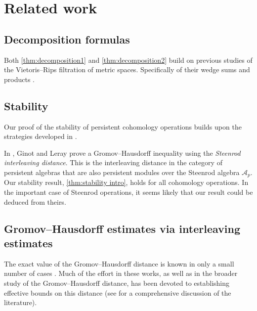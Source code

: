 
\section*{Related work}

\subsection*{Decomposition formulas}

Both \cref{thm:decomposition1} and \cref{thm:decomposition2} build on previous studies of the Vietoris--Rips filtration of metric spaces.
Specifically of their wedge sums \cite{adamaszek2020homotopy} and products \cite{adamaszek2017VietorisProduct, gakhar2019k, lim2024vietoris}.

\subsection*{Stability}

Our proof of the stability of persistent cohomology operations builds upon the strategies developed in \cite{blumberg2023interleaving, zhou2023beyond, memoli2024persistent}.

In \cite[Theorem~87]{ginot2019distances}, Ginot and Leray prove a Gromov--Hausdorff inequality using the \textit{Steenrod interleaving distance}.
This is the interleaving distance in the category of persistent algebras that are also persistent modules over the Steenrod algebra \(\mathcal{A}_p\).
Our stability result, \cref{thm:stability intro}, holds for all cohomology operations.
In the important case of Steenrod operations, it seems likely that our result could be deduced from theirs.

\subsection*{Gromov--Hausdorff estimates via interleaving estimates}

The exact value of the Gromov--Hausdorff distance is known in only a small number of cases \cite{memoli2012some,ji2021gromov,adams2022gromov,talipov2022gromov,lim2021gromov,harrison2023quantitative,saul2024gromov,saul2024some}.
Much of the effort in these works, as well as in the broader study of the Gromov--Hausdorff distance, has been devoted to establishing effective bounds on this distance (see \cite{lim2021gromov} for a comprehensive discussion of the literature).


